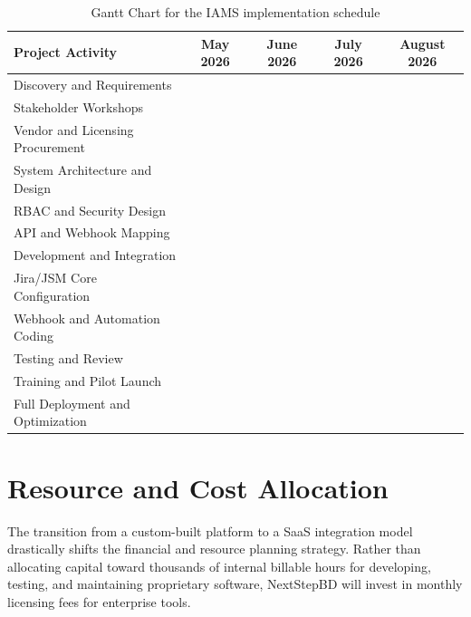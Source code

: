 \documentclass[12pt,a4paper]{report}
\begin{document}
\begin{table}[H]
\centering
\renewcommand{\arraystretch}{1.25}
\small
\begin{tabularx}{\textwidth}{|p{4.6cm}|c|c|c|c|}
\hline
\rowcolor{secondary}
\textbf{Project Activity} & \textbf{May 2026} & \textbf{June 2026} & \textbf{July 2026} & \textbf{August 2026} \\
\hline
Discovery and Requirements & \cellcolor{accent!55} & & & \\
\hline
Stakeholder Workshops & \cellcolor{accent!35} & & & \\
\hline
Vendor and Licensing Procurement & \cellcolor{accent!35} & & & \\
\hline
System Architecture and Design & \cellcolor{primary!25} & \cellcolor{primary!45} & & \\
\hline
RBAC and Security Design & & \cellcolor{primary!35} & & \\
\hline
API and Webhook Mapping & & \cellcolor{primary!35} & & \\
\hline
Development and Integration & & \cellcolor{nextstepblue!35} & \cellcolor{nextstepblue!55} & \\
\hline
Jira/JSM Core Configuration & & \cellcolor{nextstepblue!30} & & \\
\hline
Webhook and Automation Coding & & & \cellcolor{nextstepblue!45} & \\
\hline
Testing and Review & & & \cellcolor{accent!25} & \\
\hline
Training and Pilot Launch & & & \cellcolor{accent!20} & \cellcolor{accent!40} \\
\hline
Full Deployment and Optimization & & & & \cellcolor{primary!45} \\
\hline
\end{tabularx}
\caption{Gantt Chart for the IAMS implementation schedule}
\end{table}

\section{Resource and Cost Allocation}

The transition from a custom-built platform to a SaaS integration model drastically shifts the financial and resource planning strategy. Rather than allocating capital toward thousands of internal billable hours for developing, testing, and maintaining proprietary software, NextStepBD will invest in monthly licensing fees for enterprise tools. 
\end{document}
